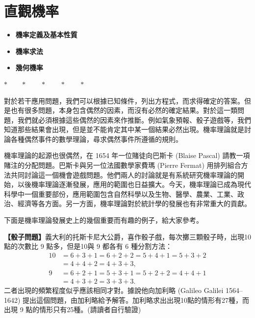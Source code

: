 \section{直觀機率}\label{sec:b5s-ch3}

\begin{center}
\begin{minipage}{0.75\textwidth}
\begin{itemize}[leftmargin=2em, itemsep=0.3em]
  \item[§ III-1] \textbf{機率定義及基本性質}
  \item[§ III-2] \textbf{機率求法}
  \item[*§ III-3] \textbf{幾何機率}
\end{itemize}
\end{minipage}
\end{center}

\begin{center}
$* \qquad * \qquad * \qquad * \qquad *$
\end{center}

對於若干應用問題，我們可以根據已知條件，列出方程式，而求得確定的答案。但是也有很多問題，本身包含偶然的因素，而沒有必然的確定結果。對於這一類問題，我們就必須根據這些偶然的因素來作推斷。例如氣象預報、骰子遊戲等，我們知道那些結果會出現，但是並不能肯定其中某一個結果必然出現。機率理論就是討論各種偶然事件的數學理論，尋求偶然事件所遵循的規則。

機率理論的起源也很偶然，在 1654 年一位賭徒向巴斯卡 (Blaise Pascal) 請教一項賭注的分配問題。巴斯卡與另一位法國數學家費瑪 (Pierre Fermat) 用排列組合方法共同討論這一個機會遊戲問題。他們兩人的討論就是有系統研究機率理論的開始，以後機率理論逐漸發展，應用的範圍也日益擴大。今天，機率理論已成為現代科學中一個重要部份，應用範圍包含自然科學以及生物、醫學、農業、工業、政治、經濟等各方面。另一方面，機率理論對於統計學的發展也有非常重大的貢獻。

下面是機率理論發展史上的幾個重要而有趣的例子，給大家參考。

\medskip
\noindent\textbf{【骰子問題】}義大利的托斯卡尼大公爵，喜作骰子戲，每次擲三顆骰子時，出現10點的次數比 9 點多，但是10與 9 都各有 6 種分割方法：
\begin{align*}
10 &= 6 + 3 + 1 = 6 + 2 + 2 = 5 + 4 + 1 = 5 + 3 + 2 \\
   &= 4 + 4 + 2 = 4 + 3 + 3, \\
9  &= 6 + 2 + 1 = 5 + 3 + 1 = 5 + 2 + 2 = 4 + 4 + 1 \\
   &= 4 + 3 + 2 = 3 + 3 + 3.
\end{align*}
二者出現的頻繁程度似乎應該相同才對。據說他向加利略 (Galileo Galilei 1564--1642) 提出這個問題，由加利略給予解答。加利略求出出現10點的情形有27種，而出現 9 點的情形只有25種。(請讀者自行驗證)

